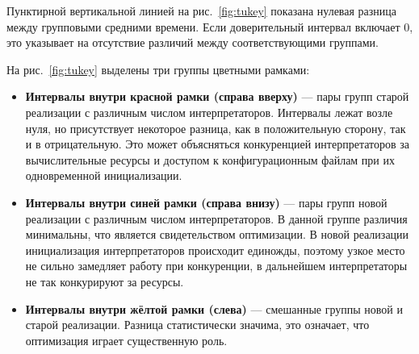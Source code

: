 Пунктирной вертикальной линией на рис.~\ref{fig:tukey}
показана нулевая разница между групповыми средними времени.
Если доверительный интервал включает 0,
это указывает на отсутствие различий
между соответствующими группами.

На рис.~\ref{fig:tukey} выделены три группы цветными рамками:
\begin{itemize}
    \item \textbf{Интервалы внутри красной рамки (справа вверху)} ---
        пары групп старой реализации с различным числом интерпретаторов.
        Интервалы лежат возле нуля, но присутствует
        некоторое разница, как в положительную сторону,
        так и в отрицательную. Это может объясняться
        конкуренцией интерпретаторов
        за вычислительные ресурсы и доступом к конфигурационным файлам
        при их одновременной инициализации.
    \item \textbf{Интервалы внутри синей рамки (справа внизу)} ---
        пары групп новой реализации с различным числом интерпретаторов.
        В данной группе различия минимальны,
        что является свидетельством оптимизации.
        В новой реализации инициализация интерпретаторов
        происходит единожды, поэтому
        узкое место не сильно замедляет работу
        при конкуренции, в дальнейшем
        интерпретаторы не так конкурируют за ресурсы.
    \item \textbf{Интервалы внутри жёлтой рамки (слева)} ---
        смешанные группы новой и старой реализации.
        Разница статистически значима,
        это означает, что оптимизация играет существенную роль.
\end{itemize}

